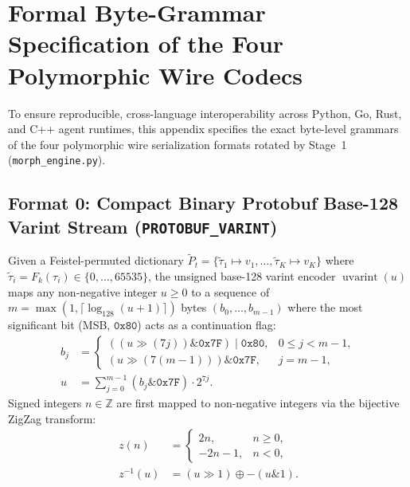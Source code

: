 \documentclass[conference,10pt]{IEEEtran}
\begin{document}
\section{Formal Byte-Grammar Specification of the Four Polymorphic Wire Codecs}
\label{app:codecs}

To ensure reproducible, cross-language interoperability across Python, Go, Rust, and C++ agent runtimes, this appendix specifies the exact byte-level grammars of the four polymorphic wire serialization formats rotated by Stage~1 (\texttt{morph\_engine.py}).

\subsection{Format 0: Compact Binary Protobuf Base-128 Varint Stream (\texttt{PROTOBUF\_VARINT})}
Given a Feistel-permuted dictionary $\tilde{P}_t = \{\tilde{\tau}_1 \mapsto v_1, \dots, \tilde{\tau}_K \mapsto v_K\}$ where $\tilde{\tau}_i = F_k(\tau_i) \in \{0, \dots, 65535\}$, the unsigned base-128 varint encoder $\operatorname{uvarint}(u)$ maps any non-negative integer $u \ge 0$ to a sequence of $m = \max(1, \lceil \log_{128}(u + 1) \rceil)$ bytes $(b_0, \dots, b_{m-1})$ where the most significant bit (MSB, $\mathtt{0x80}$) acts as a continuation flag:
\begin{equation}
\label{eq:uvarint_def}
\begin{aligned}
b_j &= \begin{cases}
\left((u \gg (7j)) \mathbin{\&} \mathtt{0x7F}\right) \mid \mathtt{0x80}, & 0 \le j < m - 1, \\
(u \gg (7(m-1))) \mathbin{\&} \mathtt{0x7F}, & j = m - 1,
\end{cases} \\
u &= \sum_{j=0}^{m-1} (b_j \mathbin{\&} \mathtt{0x7F}) \cdot 2^{7j}.
\end{aligned}
\end{equation}
Signed integers $n \in \mathbb{Z}$ are first mapped to non-negative integers via the bijective ZigZag transform:
\begin{equation}
\label{eq:zigzag_def}
\begin{aligned}
z(n) &= \begin{cases}
2n, & n \ge 0, \\
-2n - 1, & n < 0,
\end{cases} \\
z^{-1}(u) &= (u \gg 1) \oplus -(u \mathbin{\&} 1).
\end{aligned}
\end{equation}
\end{document}
